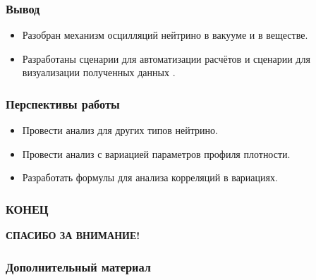 \documentclass[utf8,9pt,mathserif,usepdftitle=false]{beamer}
\begin{document}
\begin{frame}
	\frametitle{Вывод}
	\begin{itemize}
		\item<1-> Разобран механизм осцилляций нейтрино в вакууме и в веществе.
		\item<2-> Разработаны сценарии для автоматизации расчётов и сценарии для визуализации полученных данных . 
	\end{itemize}
\end{frame}

\begin{frame}
	\frametitle{Перспективы работы}
	\begin{itemize}
		\item<1-> Провести анализ для других типов нейтрино.
		\item<2-> Провести анализ с вариацией параметров профиля плотности.
		\item<3-> Разработать формулы для анализа корреляций в вариациях.
	\end{itemize}
\end{frame}

\begin{frame}
  \frametitle{КОНЕЦ}
  \LARGE\centering\bfseries
  СПАСИБО ЗА ВНИМАНИЕ!
\end{frame}

\begin{frame}
  \frametitle{Дополнительный материал}
\end{frame}
\end{document}
